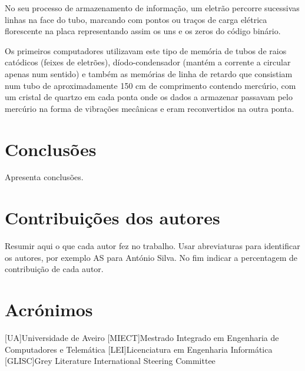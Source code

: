 \documentclass{report}
\begin{document}
	No seu processo de armazenamento de informação, um eletrão percorre sucessivas linhas na face do tubo, marcando com pontos ou traços de carga elétrica florescente na placa representando assim os uns e os zeros do código binário.
\vspace{1mm}
	
	Os primeiros computadores utilizavam este tipo de memória de tubos de raios catódicos (feixes de eletrões), díodo-condensador (mantém a corrente a circular apenas num sentido) e também as memórias de linha de retardo que consistiam num tubo de aproximadamente 150 cm de comprimento contendo mercúrio, com um cristal de quartzo em cada ponta onde os dados a armazenar passavam pelo mercúrio na forma de vibrações mecânicas e eram reconvertidos na outra ponta.
\vspace{1mm}



\chapter{Conclusões}
\label{chap.conclusao}
Apresenta conclusões.

\chapter*{Contribuições dos autores}
Resumir aqui o que cada autor fez no trabalho.
Usar abreviaturas para identificar os autores,
por exemplo AS para António Silva.
No fim indicar a percentagem de contribuição de cada autor.

\chapter*{Acrónimos}
\begin{acronym}
[UA]{Universidade de Aveiro}
[MIECT]{Mestrado Integrado em Engenharia de Computadores e Telemática}
[LEI]{Licenciatura em Engenharia Informática}
[GLISC]{Grey Literature International Steering Committee}
\end{acronym}


\printbibliography
\end{document}
